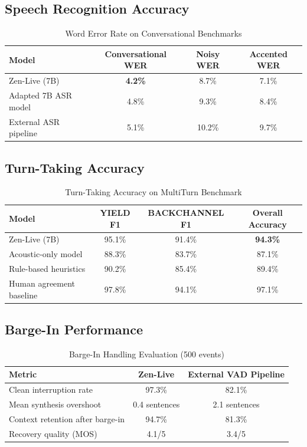 \documentclass[11pt,a4paper]{article}
\begin{document}
\subsection{Speech Recognition Accuracy}

\begin{table}[H]
\centering
\caption{Word Error Rate on Conversational Benchmarks}
\begin{tabular}{lccc}
\toprule
\textbf{Model} & \textbf{Conversational WER} & \textbf{Noisy WER} & \textbf{Accented WER} \\
\midrule
Zen-Live (7B) & \textbf{4.2\%} & 8.7\% & 7.1\% \\
Adapted 7B ASR model & 4.8\% & 9.3\% & 8.4\% \\
External ASR pipeline & 5.1\% & 10.2\% & 9.7\% \\
\bottomrule
\end{tabular}
\end{table}

\subsection{Turn-Taking Accuracy}

\begin{table}[H]
\centering
\caption{Turn-Taking Accuracy on MultiTurn Benchmark}
\begin{tabular}{lccc}
\toprule
\textbf{Model} & \textbf{YIELD F1} & \textbf{BACKCHANNEL F1} & \textbf{Overall Accuracy} \\
\midrule
Zen-Live (7B) & 95.1\% & 91.4\% & \textbf{94.3\%} \\
Acoustic-only model & 88.3\% & 83.7\% & 87.1\% \\
Rule-based heuristics & 90.2\% & 85.4\% & 89.4\% \\
Human agreement baseline & 97.8\% & 94.1\% & 97.1\% \\
\bottomrule
\end{tabular}
\end{table}

\subsection{Barge-In Performance}

\begin{table}[H]
\centering
\caption{Barge-In Handling Evaluation (500 events)}
\begin{tabular}{lcc}
\toprule
\textbf{Metric} & \textbf{Zen-Live} & \textbf{External VAD Pipeline} \\
\midrule
Clean interruption rate & 97.3\% & 82.1\% \\
Mean synthesis overshoot & 0.4 sentences & 2.1 sentences \\
Context retention after barge-in & 94.7\% & 81.3\% \\
Recovery quality (MOS) & 4.1/5 & 3.4/5 \\
\bottomrule
\end{tabular}
\end{table}
\end{document}
